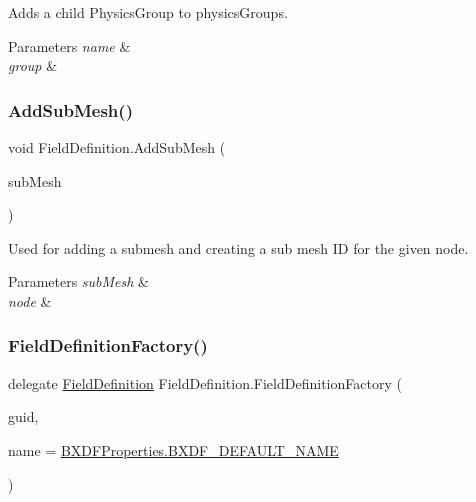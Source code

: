 Adds a child Physics\+Group to physics\+Groups. 


\begin{DoxyParams}{Parameters}
{\em name} & \\
\hline
{\em group} & \\
\hline
\end{DoxyParams}
\mbox{\label{class_field_definition_ad2d85f2d301af51825dd119f15936357}} 
\subsubsection{\texorpdfstring{Add\+Sub\+Mesh()}{AddSubMesh()}}
{\footnotesize\ttfamily void Field\+Definition.\+Add\+Sub\+Mesh (\begin{DoxyParamCaption}\item[{\hyperlink{class_b_x_d_a_mesh_1_1_b_x_d_a_sub_mesh}{B\+X\+D\+A\+Mesh.\+B\+X\+D\+A\+Sub\+Mesh}}]{sub\+Mesh }\end{DoxyParamCaption})}



Used for adding a submesh and creating a sub mesh ID for the given node. 


\begin{DoxyParams}{Parameters}
{\em sub\+Mesh} & \\
\hline
{\em node} & \\
\hline
\end{DoxyParams}
\mbox{\label{class_field_definition_af50dfa2594c8b9ac6fcc592356c0117a}} 
\subsubsection{\texorpdfstring{Field\+Definition\+Factory()}{FieldDefinitionFactory()}}
{\footnotesize\ttfamily delegate \hyperlink{class_field_definition}{Field\+Definition} Field\+Definition.\+Field\+Definition\+Factory (\begin{DoxyParamCaption}\item[{Guid}]{guid,  }\item[{string}]{name = {\ttfamily \hyperlink{class_b_x_d_f_properties_a528bb431080585f72f9f74bd44a23932}{B\+X\+D\+F\+Properties.\+B\+X\+D\+F\+\_\+\+D\+E\+F\+A\+U\+L\+T\+\_\+\+N\+A\+ME}} }\end{DoxyParamCaption})}



